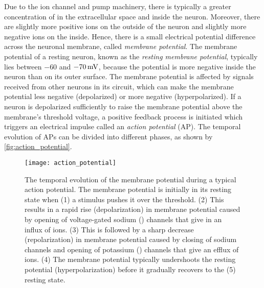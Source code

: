 Due to the ion channel and pump machinery, there is typically a greater concentration of \Na in the extracellular space and \K inside the neuron. Moreover, there are slightly more positive ions on the outside of the neuron and slightly more negative ions on the inside. Hence, there is a small electrical potential difference across the neuronal membrane, called \textit{membrane potential}. The membrane potential of a resting neuron, known as the \textit{resting membrane potential}, typically lies between $-60$ and $-70 \,\mathrm{mV}$, because the potential is more negative inside the neuron than on its outer surface. The membrane potential is affected by signals received from other neurons in its circuit, which can make the membrane potential less negative (depolarized) or more negative (hyperpolarized). If a neuron is depolarized sufficiently to raise the membrane potential above the membrane's threshold voltage, a positive feedback process is initiated which triggers an electrical impulse called an \textit{action potential} (AP). The temporal evolution of APs can be divided into different phases, as shown by \autoref{fig:action_potential}.
\begin{figure}[!htb]
    \centering
    \texttt{[image: action\_potential]}
    \caption{The temporal evolution of the membrane potential during a typical action potential. The membrane potential is initially in its resting state when (1) a stimulus pushes it over the threshold. (2) This results in a rapid rise (depolarization) in membrane potential caused by opening of voltage-gated sodium (\Na) channels that give in an influx of \Na ions. (3) This is followed by a sharp decrease (repolarization) in membrane potential caused by closing of sodium channels and opening of potassium (\K) channels that give an efflux of \K ions. (4) The membrane potential typically undershoots the resting potential (hyperpolarization) before it gradually recovers to the (5) resting state. 
    }
    \label{fig:action_potential}
\end{figure}
